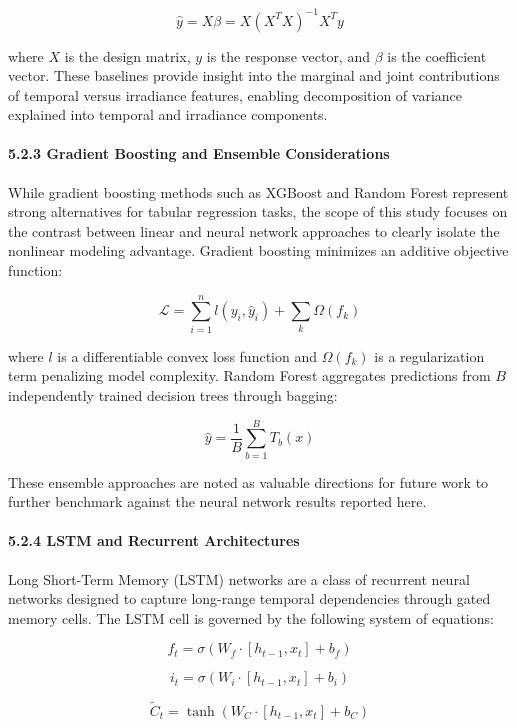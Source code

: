 \documentclass[
  11pt,
]{article}
\begin{document}
\[\hat{y} = X\beta = X(X^TX)^{-1}X^Ty\]

where \(X\) is the design matrix, \(y\) is the response vector, and
\(\beta\) is the coefficient vector. These baselines provide insight
into the marginal and joint contributions of temporal versus irradiance
features, enabling decomposition of variance explained into temporal and
irradiance components.

\paragraph{5.2.3 Gradient Boosting and Ensemble
Considerations}\label{gradient-boosting-and-ensemble-considerations}

While gradient boosting methods such as XGBoost and Random Forest
represent strong alternatives for tabular regression tasks, the scope of
this study focuses on the contrast between linear and neural network
approaches to clearly isolate the nonlinear modeling advantage. Gradient
boosting minimizes an additive objective function:

\[\mathcal{L} = \sum_{i=1}^n l(y_i, \hat{y}_i) + \sum_{k} \Omega(f_k)\]

where \(l\) is a differentiable convex loss function and \(\Omega(f_k)\)
is a regularization term penalizing model complexity. Random Forest
aggregates predictions from \(B\) independently trained decision trees
through bagging:

\[\hat{y} = \frac{1}{B}\sum_{b=1}^{B} T_b(x)\]

These ensemble approaches are noted as valuable directions for future
work to further benchmark against the neural network results reported
here.

\paragraph{5.2.4 LSTM and Recurrent
Architectures}\label{lstm-and-recurrent-architectures}

Long Short-Term Memory (LSTM) networks are a class of recurrent neural
networks designed to capture long-range temporal dependencies through
gated memory cells. The LSTM cell is governed by the following system of
equations:

\[f_t = \sigma(W_f \cdot [h_{t-1}, x_t] + b_f)\]

\[i_t = \sigma(W_i \cdot [h_{t-1}, x_t] + b_i)\]

\[\tilde{C}_t = \tanh(W_C \cdot [h_{t-1}, x_t] + b_C)\]
\end{document}
